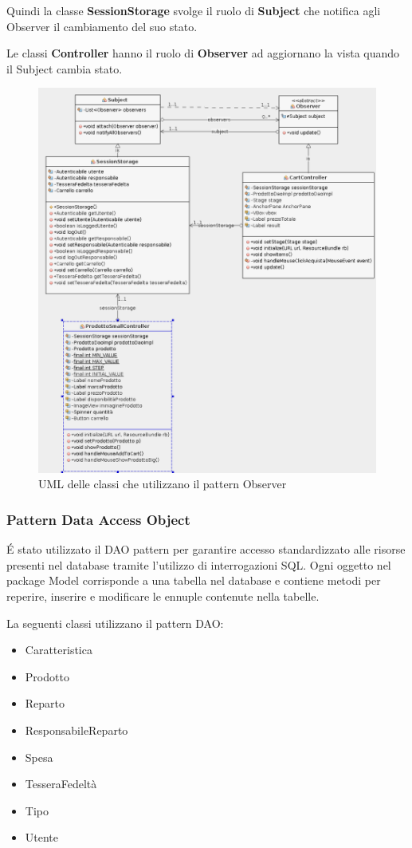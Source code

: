 \documentclass{article}
\begin{document}
\noindent Quindi la classe \textbf{SessionStorage} svolge il ruolo di \textbf{Subject} che notifica agli
Observer il cambiamento del suo stato.


\noindent Le classi \textbf{Controller} hanno il ruolo di \textbf{Observer} ad aggiornano la vista quando
il Subject cambia stato.

\begin{figure}[h!]
	\centering
	\includegraphics[width=\textwidth]{UmlObserver.png}
	\caption{UML delle classi che utilizzano il pattern Observer}
	\label{fig:UmlProdotto}
\end{figure}
\clearpage
\newpage
\subsubsection{Pattern Data Access Object}
\'E stato utilizzato il DAO pattern per garantire accesso standardizzato alle risorse presenti nel database
tramite l'utilizzo di interrogazioni SQL.
Ogni oggetto nel package Model corrisponde a una tabella nel database e contiene metodi per reperire, inserire
e modificare le ennuple contenute nella tabelle.


\noindent La seguenti classi utilizzano il pattern DAO:
\begin{itemize}
	\item Caratteristica
	\item Prodotto
	\item Reparto
	\item ResponsabileReparto
	\item Spesa
	\item TesseraFedeltà
	\item Tipo
	\item Utente
\end{itemize}
\end{document}
